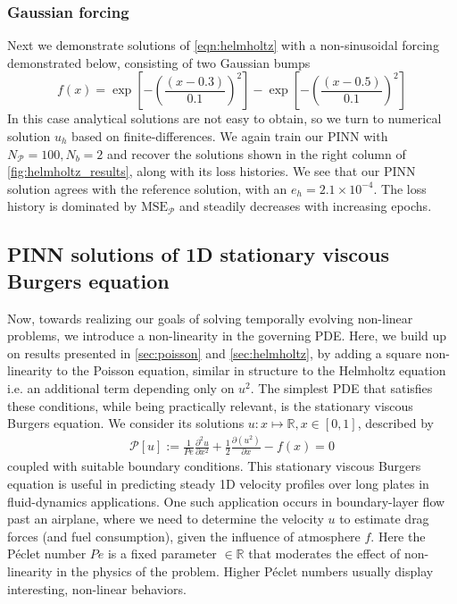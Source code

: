 \documentclass[11pt]{article}
\newcommand{\mse}{\textrm{MSE}}
\newcommand{\pde}{\ensuremath{\mathcal{P}}}
\begin{document}
\subsubsection{Gaussian forcing}
\label{sec:orgf33662f}
Next we demonstrate solutions of \cref{eqn:helmholtz} with a non-sinusoidal
forcing demonstrated below, consisting of two Gaussian bumps
\[ f(x) = \exp\left[-\left(\frac{(x - 0.3)}{0.1}\right)^2\right] -  \exp\left[-\left(\frac{(x -
   0.5)}{0.1}\right)^2\right] \]
In this case analytical solutions are not easy to obtain, so we turn to numerical
solution \({u}_h\) based on finite-differences. We again train our PINN with
\(N_\pde = 100 , N_b = 2\) and recover the solutions
shown in the right column of \cref{fig:helmholtz_results}, along with its loss
histories. We see that our PINN solution agrees with the reference solution,
with an \(e_h = 2.1 \times 10^{-4}\). The loss history is dominated by \(\mse_\pde\) and steadily decreases with increasing epochs.

\subsection{PINN solutions of 1D stationary viscous Burgers equation}
\label{sec:stationary_burgers}
Now, towards realizing our goals of solving temporally evolving non-linear
problems, we introduce a non-linearity in the governing PDE. Here, we build
up on results presented in \cref{sec:poisson} and \cref{sec:helmholtz}, by adding
a square non-linearity to the Poisson equation, similar in structure to the Helmholtz
equation i.e. an additional term depending only on \(u^2\). The simplest
PDE that satisfies these conditions, while being practically relevant, is the
stationary viscous Burgers equation. We consider its solutions \(u : x
   \mapsto \mathbb{R}, x \in [0, 1]\), described by
\begin{equation}
\label{eqn:stationary_burgers}
\begin{aligned}
	 \pde[ u ] := \frac{1}{Pe}\frac{\partial^2 u}{\partial x^2} + \frac{1}{2}\frac{\partial \left(u^2\right)}{\partial x} - f(x) = 0
\end{aligned}
\end{equation}
coupled with suitable boundary conditions. This stationary viscous Burgers
equation is useful in predicting steady 1D velocity profiles over long plates
in fluid-dynamics applications. One
such application occurs in boundary-layer flow past an airplane, where we need to determine
the velocity \(u\) to estimate drag forces (and fuel consumption), given
the influence of atmosphere \(f\). Here the Péclet number \(Pe\) is
a fixed parameter \(\in \mathbb{R}\) that moderates the effect of
non-linearity in the physics of the problem. Higher Péclet numbers usually
display interesting, non-linear behaviors.
\end{document}
